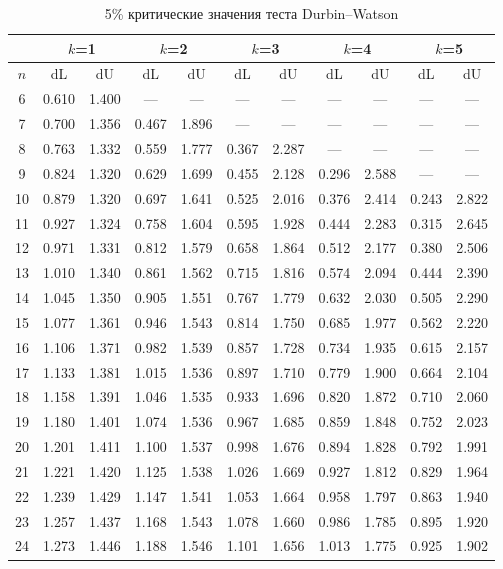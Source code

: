 \documentclass[12pt]{article}
\begin{document}
\begin{table}
\caption{5\% критические значения теста Durbin--Watson}
\begin{center}
{\footnotesize
\begin{tabular}{|c|c|c|c|c|c|c|c|c|c|c|}
	\hline
	& \multicolumn{2}{c|}{$k$=1}& \multicolumn{2}{c|}{$k$=2}& \multicolumn{2}{c|}{$k$=3}
	& \multicolumn{2}{c|}{$k$=4} & \multicolumn{2}{c|}{$k$=5} \\ \hline
	$n$ &dL& dU& dL &dU &dL& dU& dL& dU& dL& dU\\ \hline
	6&0.610&1.400&---&---&---&---&---&---&---&---\\
	7 &0.700&1.356&0.467&1.896&---&---&---&---&---&---\\
	8&0.763&1.332&0.559&1.777&0.367&2.287&---&---&---&---\\
	9&0.824&1.320&0.629&1.699&0.455&2.128&0.296&2.588&---&---\\
	10&0.879&1.320&0.697&1.641&0.525&2.016&0.376&2.414&0.243&2.822\\
	11&0.927&1.324&0.758&1.604&0.595&1.928&0.444&2.283&0.315&2.645\\
	12&0.971&1.331&0.812&1.579&0.658&1.864&0.512&2.177&0.380&2.506\\
	13&1.010&1.340&0.861&1.562&0.715&1.816&0.574&2.094&0.444&2.390\\
	14&1.045&1.350&0.905&1.551&0.767&1.779&0.632&2.030&0.505&2.290\\
	15&1.077&1.361&0.946&1.543&0.814&1.750&0.685&1.977&0.562&2.220\\
	16&1.106&1.371&0.982&1.539&0.857&1.728&0.734&1.935&0.615&2.157\\
	17&1.133&1.381&1.015&1.536&0.897&1.710&0.779&1.900&0.664&2.104\\
	18&1.158&1.391&1.046&1.535&0.933&1.696&0.820&1.872&0.710&2.060\\
	19&1.180&1.401&1.074&1.536&0.967&1.685&0.859&1.848&0.752&2.023\\
	20&1.201&1.411&1.100&1.537&0.998&1.676&0.894&1.828&0.792&1.991\\
	21&1.221&1.420&1.125&1.538&1.026&1.669&0.927&1.812&0.829&1.964\\
	22&1.239&1.429&1.147&1.541&1.053&1.664&0.958&1.797&0.863&1.940\\
	23&1.257&1.437&1.168&1.543&1.078&1.660&0.986&1.785&0.895&1.920\\
	24&1.273&1.446&1.188&1.546&1.101&1.656&1.013&1.775&0.925&1.902\\

\end{tabular}}
\end{center}
\end{table}
\end{document}
